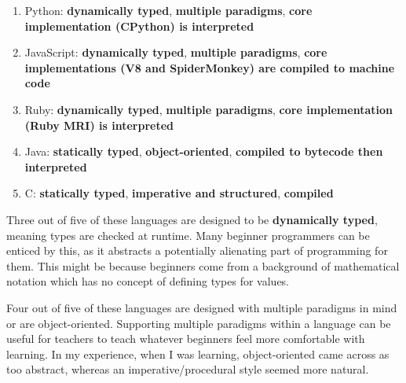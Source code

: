 \begin{enumerate}
    \item Python: \textbf{dynamically typed}, \textbf{multiple paradigms}, \textbf{core implementation (CPython) is interpreted}\textsuperscript{\cite{5_easiest_and_hardest_programming_languages_to_learn}}\textsuperscript{\cite{6_easiest_programming_languages_to_learn}}\textsuperscript{\cite{deery_2021}}
    \item JavaScript: \textbf{dynamically typed}, \textbf{multiple paradigms}, \textbf{core implementations (V8 and SpiderMonkey) are compiled to machine code}\textsuperscript{\cite{5_easiest_and_hardest_programming_languages_to_learn}}\textsuperscript{\cite{6_easiest_programming_languages_to_learn}}\textsuperscript{\cite{deery_2021}}
    \item Ruby: \textbf{dynamically typed}, \textbf{multiple paradigms}, \textbf{core implementation (Ruby MRI) is interpreted}\textsuperscript{\cite{6_easiest_programming_languages_to_learn}}\textsuperscript{\cite{deery_2021}}
    \item Java: \textbf{statically typed}, \textbf{object-oriented}, \textbf{compiled to bytecode then interpreted}\textsuperscript{\cite{5_easiest_and_hardest_programming_languages_to_learn}}\textsuperscript{\cite{6_easiest_programming_languages_to_learn}}
    \item C: \textbf{statically typed}, \textbf{imperative and structured}, \textbf{compiled}\textsuperscript{\cite{5_easiest_and_hardest_programming_languages_to_learn}}\textsuperscript{\cite{6_easiest_programming_languages_to_learn}}
\end{enumerate}

Three out of five of these languages are designed to be \textbf{dynamically typed}, meaning types are checked at runtime. Many beginner programmers can be enticed by this, as it abstracts a potentially alienating part of programming for them. This might be because beginners come from a background of mathematical notation which has no concept of defining types for values.

Four out of five of these languages are designed with multiple paradigms in mind or are object-oriented. Supporting multiple paradigms within a language can be useful for teachers to teach whatever beginners feel more comfortable with learning. In my experience, when I was learning, object-oriented came across as too abstract, whereas an imperative/procedural style seemed more natural.

